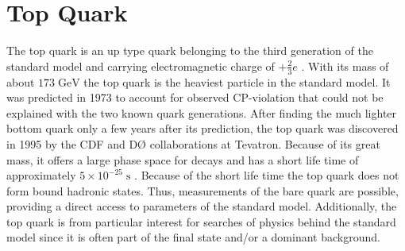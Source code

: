\section{Top Quark}
	The top quark is an up type quark belonging to the third generation of the standard model and carrying electromagnetic charge of $+\frac{2}{3}e$ \cite{pdg2016}. With its mass of about $173\;\text{GeV}$ the top quark is the heaviest particle in the standard model. It was predicted in 1973 \cite{topPredict} to account for observed CP-violation that could not be explained with the two known quark generations. After finding the much lighter bottom quark only a few years after its prediction, the top quark was discovered in 1995 by the CDF \cite{topCDF} and D\O{} \cite{topD0} collaborations at Tevatron. Because of its great mass, it offers a large phase space for decays and has a short life time of approximately $5 \times 10^{-25}\;\text{s}$ \cite{pdg2016}. Because of the short life time the top quark does not form bound hadronic states. Thus, measurements of the bare quark are possible, providing a direct access to parameters of the standard model. Additionally, the top quark is from particular interest for searches of physics behind the standard model since it is often part of the final state and/or a dominant background. 
	
